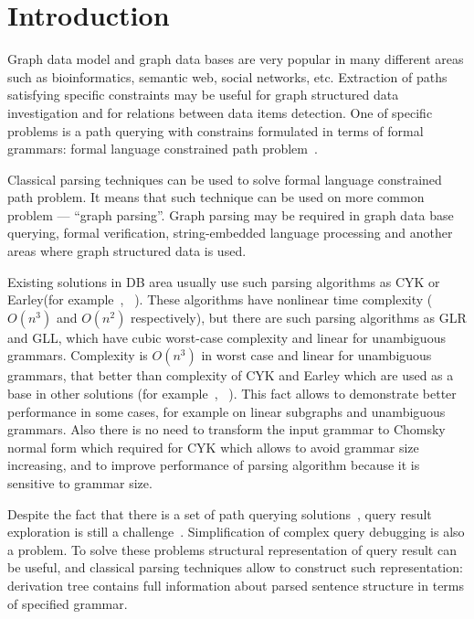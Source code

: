 \documentclass{sig-alternate} %
\begin{document}
\section{Introduction}
Graph data model and graph data bases are very popular in many different areas such as bioinformatics, semantic web, social networks, etc.
Extraction of paths satisfying specific constraints may be useful for graph structured data investigation and for relations between data items detection.
One of specific problems is a path querying with constrains formulated in terms of formal grammars: formal language constrained path problem~\cite{FLCpathProblem}.


Classical parsing techniques can be used to solve formal language constrained path problem. 
It means that such technique can be used on more common problem --- ``graph parsing''. 
Graph parsing may be required in graph data base querying, formal verification, string-embedded language processing and another areas where graph structured data is used. 


Existing solutions in DB area usually use such parsing algorithms as CYK or Earley(for example~\cite{ConjCFPathQuery}, ~\cite{GraphQueryWithEarley}). These algorithms have nonlinear time complexity ($O(n^3)$ and $O(n^2)$ respectively), but there are such parsing algorithms as GLR and GLL, which have cubic worst-case complexity and linear for unambiguous grammars.  
Complexity is $O(n^3)$ in worst case and linear for unambiguous grammars, that better than complexity of CYK and Earley which are used as a base in other solutions (for example~\cite{ConjCFPathQuery}, ~\cite{GraphQueryWithEarley}).
This fact allows to demonstrate better performance in some cases, for example on linear subgraphs and unambiguous grammars. 
Also there is no need to transform the input grammar to Chomsky normal form which required for CYK which allows to avoid grammar size increasing, and to improve performance of parsing algorithm because it is sensitive to grammar size.

Despite the fact that there is a set of path querying solutions~\cite{GraphQueryWithEarley, ConjCFPathQuery, !!!}, query result exploration is still a challenge~\cite{hofman2015separabilityForRegQueryDebugging}. 
Simplification of complex query debugging is also a problem.
To solve these problems structural representation of query result can be useful, and classical parsing techniques allow to construct such representation: derivation tree contains full information about parsed sentence structure in terms of specified grammar.
\end{document}
